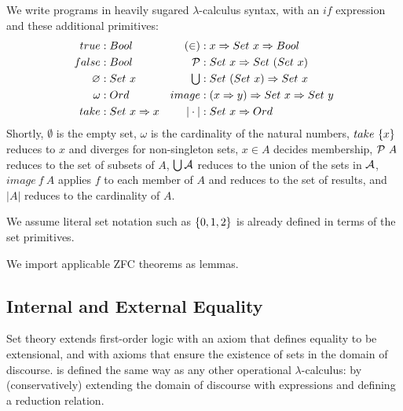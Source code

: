 \documentclass[preprint]{sigplanconf}
\begin{document}
We write \lzfclang programs in heavily sugared $\lambda$-calculus syntax, with an $if$ expression and these additional primitives:
\begin{equation}
\begin{aligned}
	\begin{aligned}
		true &: Bool \\
		false &: Bool \\
		\varnothing &: Set~x \\
		\omega &: Ord \\
		take &: Set~x \Rightarrow x \\
	\end{aligned}
	&\ \ \ 
	\begin{aligned}
		(\in) &: x \Rightarrow Set~x \Rightarrow Bool \\
		\mathcal{P} &: Set~x \Rightarrow Set~(Set~x) \\
		\textstyle\bigcup &: Set~(Set~x) \Rightarrow Set~x \\
		image &: (x \Rightarrow y) \Rightarrow Set~x \Rightarrow Set~y \\
		|\cdot| &: Set~x \Rightarrow Ord \\
	\end{aligned} \\
\end{aligned}
\label{eqn:lzfc-prims}
\end{equation}
Shortly, $\emptyset$ is the empty set, $\omega$ is the cardinality of the natural numbers, $take~\{{x}\}$ reduces to $x$ and diverges for non-singleton sets, $x \in A$ decides membership, $\mathcal{P}~A$ reduces to the set of subsets of $A$, $\textstyle\bigcup\mathcal{A}$ reduces to the union of the sets in $\mathcal{A}$, $image~f~A$ applies $f$ to each member of $A$ and reduces to the set of results, and $|A|$ reduces to the cardinality of $A$.

We assume literal set notation such as $\{{0,1,2}\}$ is already defined in terms of the set primitives.

We import applicable ZFC theorems as lemmas.

\subsection{Internal and External Equality}

Set theory extends first-order logic with an axiom that defines equality to be extensional, and with axioms that ensure the existence of sets in the domain of discourse.
\lzfclang is defined the same way as any other operational $\lambda$-calculus: by (conservatively) extending the domain of discourse with expressions and defining a reduction relation.
\end{document}
